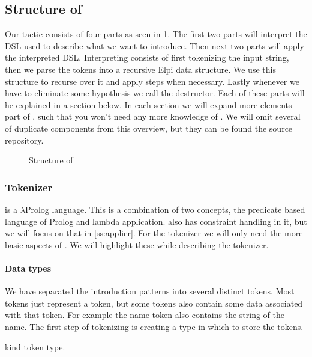 \documentclass[thesis.tex]{subfiles}
\begin{document}
{{\subsection[Structure of eiIntros]{Structure of }
Our \elpi tactic consists of four parts as seen in \cref{fig:eiintrosstruct}. The first two parts will interpret the DSL used to describe what we want to introduce. Then next two parts will apply the interpreted DSL. Interpreting consists of first tokenizing the input string, then we parse the tokens into a recursive Elpi data structure. We use this structure to recurse over it and apply steps when necessary. Lastly whenever we have to eliminate some hypothesis we call the destructor. Each of these parts will he explained in a section below. In each section we will expand more elements part of \elpi, such that you won't need any more knowledge of \elpi. We will omit several of duplicate components from this overview, but they can be found the source repository.
\begin{figure}
  \centering
  \caption{Structure of }
  \label{fig:eiintrosstruct}
\end{figure}

\subsubsection{Tokenizer}
\elpi is a $\lambda$Prolog language. This is a combination of two concepts, the predicate based language of Prolog and lambda application. \elpi also has constraint handling in it, but we will focus on that in \cref{ss:applier}. For the tokenizer we will only need the more basic aspects of \elpi. We will highlight these while describing the tokenizer.

\paragraph*{Data types}
We have separated the introduction patterns into several distinct tokens. Most tokens just represent a token, but some tokens also contain some data associated with that token. For example the name token also contains the string of the name. The first step of tokenizing is creating a type in which to store the tokens.
\begin{elpicode}
  kind token type.


\end{elpicode}}}
\end{document}
